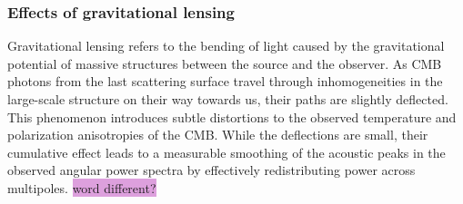 \documentclass{aa}
\numberwithin{equation}{section}
\numberwithin{table}{section}
\numberwithin{figure}{section}
\begin{document}






\subsubsection{Effects of gravitational lensing}
Gravitational lensing refers to the bending of light caused by the gravitational potential of massive structures between the source and the observer. As CMB photons from the last scattering surface travel through inhomogeneities in the large-scale structure on their way towards us, their paths are slightly deflected. This phenomenon introduces subtle distortions to the observed temperature and polarization anisotropies of the CMB. While the deflections are small, their cumulative effect leads to a measurable smoothing of the acoustic peaks in the observed angular power spectra by effectively redistributing power across multipoles. \colorbox{Plum}{word different?}
\end{document}
